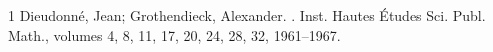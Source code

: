 \begin{thebibliography}{1}
Dieudonn\'{e}, Jean; Grothendieck, Alexander.
.
\newblock Inst. Hautes \'Etudes Sci. Publ. Math., volumes 4, 8, 11, 17, 20, 24, 28, 32, 1961--1967.
\end{thebibliography}
